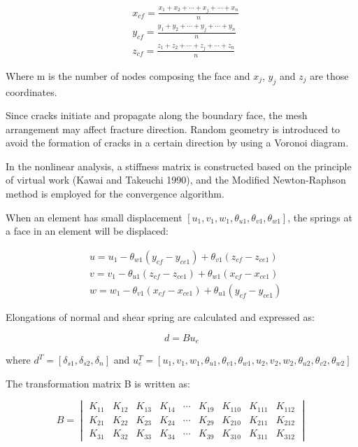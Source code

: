 \begin{equation}
  \begin{aligned}
  &x_{cf}=\frac{x_1 + x_2 + \cdots + x_j + \cdots + x_n}{n} \\
  &y_{cf}=\frac{y_1 + y_2 + \cdots + y_j + \cdots + y_n}{n} \\
  &z_{cf}=\frac{z_1 + z_2 + \cdots + z_j + \cdots + z_n}{n}
  \end{aligned}
\end{equation}

Where m is the number of nodes composing the face and $x_j$, $y_j$ and $z_j$ are those coordinates.

Since cracks initiate and propagate along the boundary face, the mesh arrangement may affect fracture direction. Random geometry is introduced to avoid the formation of cracks in a certain direction by using a Voronoi diagram.

In the nonlinear analysis, a stiffness matrix is constructed based on the principle of virtual work (Kawai and Takeuchi 1990\cite{Kawai}), and the Modified Newton-Raphson method is employed for the convergence algorithm.

When an element has small displacement $[u_1, v_1, w_1, \theta_{u1}, \theta_{v1}, \theta_{w1}]$, the springs at a face in an element will be displaced:

\begin{equation}
  \begin{aligned}
  &u = u_1 - \theta_{w1} (y_{cf} - y_{ce1}) + \theta_{v1} (z_{cf} - z_{ce1}) \\
  &v = v_1 - \theta_{u1} (z_{cf} - z_{ce1}) + \theta_{w1} (x_{cf} - x_{ce1}) \\
  &w = w_1 - \theta_{v1} (x_{cf} - x_{ce1}) + \theta_{u1} (y_{cf} - y_{ce1})
  \end{aligned}
\end{equation}

Elongations of normal and shear spring are calculated and expressed as:

\begin{equation}
  d = Bu_e
\end{equation}

where $d^T = [\delta_{s1}, \delta_{s2}, \delta_n]$ and $u_e^T = [u_1, v_1, w_1,\theta_{u1}, \theta_{v1}, \theta_{w1}, u_2, v_2, w_2,\theta_{u2}, \theta_{v2}, \theta_{w2}]$

The transformation matrix B is written as:

\begin{equation}
  B =
  \begin{vmatrix}
    K_{11} &K_{12} &K_{13} &K_{14} &{\cdots} &K_{19} &K_{110} &K_{111} &K_{112}\\
    K_{21} &K_{22} &K_{23} &K_{24} &{\cdots} &K_{29} &K_{210} &K_{211} &K_{212}\\
    K_{31} &K_{32} &K_{33} &K_{34} &{\cdots} &K_{39} &K_{310} &K_{311} &K_{312}
  \end{vmatrix}
\end{equation}

